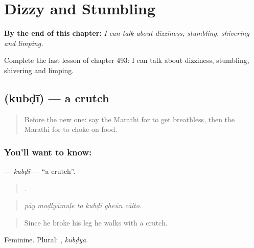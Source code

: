 
\chapter{Dizzy and Stumbling}
\label{ch:mr-dizzy-and-stumbling}

\begin{chapteropening}
\textbf{By the end of this chapter:} \emph{I can talk about dizziness, stumbling, shivering and limping.}

Complete the last lesson of chapter 493: I can talk about dizziness, stumbling, shivering and limping.
\end{chapteropening}

\section[\texorpdfstring{\mr{कुबडी} (kubḍī)}{कुबडी (kubḍī)}]{ (kubḍī) — a crutch}

\label{lesson:MR-C493-kubdi}



\begin{quote}
Before the new one: say the Marathi for to get breathless, then the Marathi for to choke on food.
\end{quote}

\subsection*{You'll want to know: }
\textbf{} — \emph{kubḍī} — \textquotedblleft{}a crutch\textquotedblright{}.

\begin{quote}
     .
\end{quote}

\begin{quote}
\emph{pāy moḍlyāmuḷe to kubḍī gheūn cālto.}
\end{quote}

\begin{quote}
Since he broke his leg he walks with a crutch.
\end{quote}

Feminine. Plural: , \emph{kubḍyā}.

